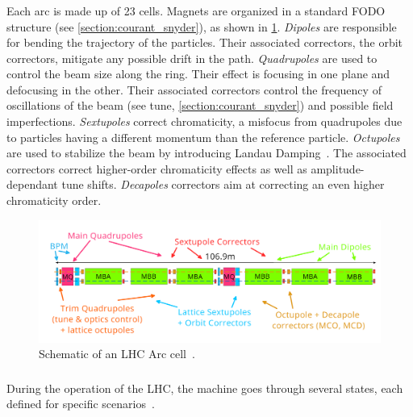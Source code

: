\subsubsection{}

Each arc is made up of 23 cells. Magnets are organized in a standard FODO structure
(see \cref{section:courant_snyder}), as shown in \cref{fig:introduction:lhc_arc_cell}.
\textit{Dipoles} are responsible for bending the trajectory of the particles. Their associated
correctors, the orbit correctors, mitigate any possible drift in the path.
\textit{Quadrupoles} are used to control the beam size along the ring. Their effect is focusing in
one plane and defocusing in the other. Their associated correctors control the frequency of
oscillations of the beam (see tune, \cref{section:courant_snyder}) and possible field imperfections.
\textit{Sextupoles} correct chromaticity, a misfocus from quadrupoles due to particles having
a different momentum than the reference particle.
\textit{Octupoles} are used to stabilize the beam by introducing Landau
Damping~\cite{gareyte_landau_1997}. The associated correctors correct higher-order chromaticity
effects as well as amplitude-dependant tune shifts.
\textit{Decapoles} correctors aim at correcting an even higher chromaticity order.

\begin{figure}[H]
    \centering
    \includegraphics[width=1\textwidth]{./images/lhc_cell.png}
    \caption{Schematic of an LHC Arc cell~\cite{bruning_lhc_2004}.}
    \label{fig:introduction:lhc_arc_cell}
\end{figure}



\subsubsection{}

During the operation of the LHC, the machine goes through several states, each defined for specific 
scenarios~\cite{wenniger_lhc_2019}.

